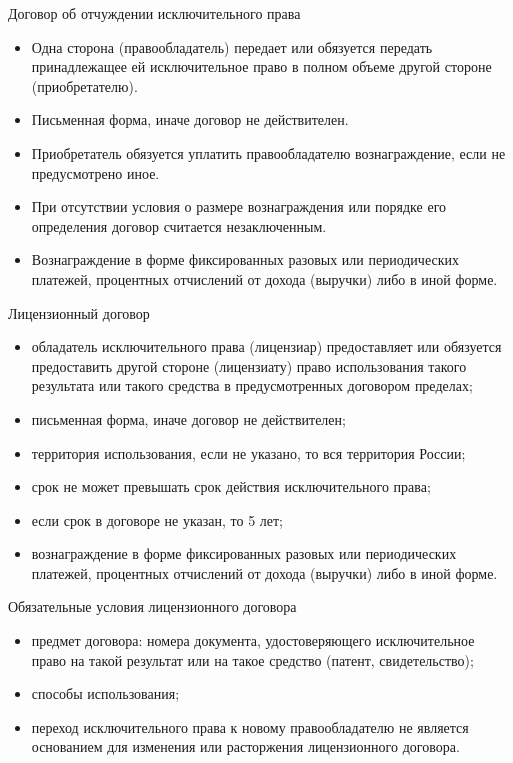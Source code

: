 \documentclass[_Venture_p2.tex]{subfiles}
\begin{document}
\begin{frame}[shrink=20]{Договор об отчуждении исключительного права}
\begin{itemize}
	\item Одна сторона (правообладатель) передает или обязуется передать принадлежащее ей исключительное право в полном объеме другой стороне (приобретателю).
	
	\item Письменная форма, иначе договор не действителен.
	
	\item Приобретатель обязуется уплатить правообладателю вознаграждение, если не предусмотрено иное.
	
	\item При отсутствии условия о размере вознаграждения или порядке его определения договор считается незаключенным. 
	
	\item Вознаграждение в форме фиксированных разовых или периодических платежей, процентных отчислений от дохода (выручки) либо в иной форме.
\end{itemize}
\end{frame}

\begin{frame}[allowframebreaks]{Лицензионный договор}
\begin{itemize}
	\item обладатель исключительного права (лицензиар) предоставляет или обязуется предоставить другой стороне (лицензиату) право использования такого результата или такого средства в предусмотренных договором пределах;
	\item письменная форма, иначе договор не действителен;
	\item территория использования, если не указано, то вся территория России; 
	
	\pagebreak
	\item срок не может превышать срок действия исключительного права;
	\item если срок в договоре не указан, то 5 лет;
	\item вознаграждение в форме фиксированных разовых или периодических платежей, процентных отчислений от дохода (выручки) либо в иной форме.
\end{itemize}
\end{frame}
\begin{frame}{Обязательные условия лицензионного договора}
\begin{itemize}
	\item предмет договора: номера документа, удостоверяющего исключительное право на такой результат или на такое средство (патент, свидетельство);
	\item способы использования;
	\item переход исключительного права к новому правообладателю не является основанием для изменения или расторжения лицензионного договора.
\end{itemize}
\end{frame}
\end{document}
